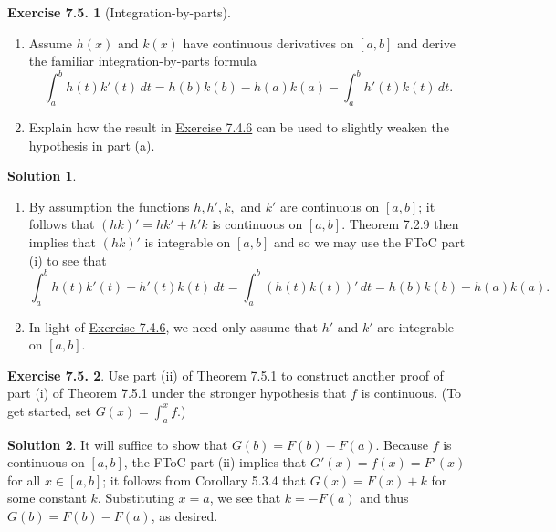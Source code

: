 \documentclass[12pt]{article}
\theoremstyle{definition}
\theoremstyle{exercise}
\newtheorem{exercise}{Exercise 7.5.}
\theoremstyle{solution}
\newtheorem*{solution}{Solution}
\begin{document}
\begin{exercise}[Integration-by-parts]
\label{ex:6}
    \begin{enumerate}
        \item Assume \( h(x) \) and \( k(x) \) have continuous derivatives on \( [a, b] \) and derive the familiar integration-by-parts formula
        \[
            \int_a^b h(t) k'(t) \, dt = h(b) k(b) - h(a) k(a) - \int_a^b h'(t) k(t) \, dt.
        \]

        \item Explain how the result in \href{https://lew98.github.io/Mathematics/UA_Section_7_4_Exercises.pdf}{Exercise 7.4.6} can be used to slightly weaken the hypothesis in part (a).
    \end{enumerate}
\end{exercise}

\begin{solution}
    \begin{enumerate}
        \item By assumption the functions \( h, h', k, \) and \( k' \) are continuous on \( [a, b] \); it follows that \( (hk)' = h k' + h' k \) is continuous on \( [a, b] \). Theorem 7.2.9 then implies that \( (hk)' \) is integrable on \( [a, b] \) and so we may use the FToC part (i) to see that
        \[
            \int_a^b h(t) k'(t) + h'(t) k(t) \, dt = \int_a^b (h(t) k(t))' \, dt = h(b) k(b) - h(a) k(a).
        \]

        \item In light of \href{https://lew98.github.io/Mathematics/UA_Section_7_4_Exercises.pdf}{Exercise 7.4.6}, we need only assume that \( h' \) and \( k' \) are integrable on \( [a, b] \).
    \end{enumerate}
\end{solution}

\begin{exercise}
\label{ex:7}
    Use part (ii) of Theorem 7.5.1 to construct another proof of part (i) of Theorem 7.5.1 under the stronger hypothesis that \( f \) is continuous. (To get started, set \( G(x) = \int_a^x f \).)
\end{exercise}

\begin{solution}
    It will suffice to show that \( G(b) = F(b) - F(a) \). Because \( f \) is continuous on \( [a, b] \), the FToC part (ii) implies that \( G'(x) = f(x) = F'(x) \) for all \( x \in [a, b] \); it follows from Corollary 5.3.4 that \( G(x) = F(x) + k \) for some constant \( k \). Substituting \( x = a \), we see that \( k = -F(a) \) and thus \( G(b) = F(b) - F(a) \), as desired.
\end{solution}
\end{document}
